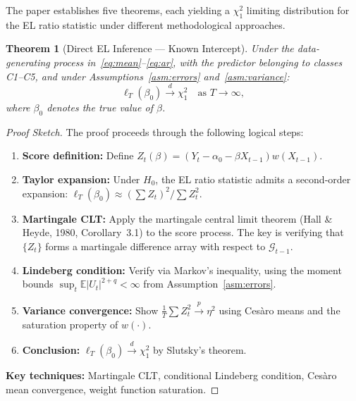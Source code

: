 \documentclass[11pt,a4paper]{article}
\newtheorem{theorem}{Theorem}[section]
\theoremstyle{definition}
\theoremstyle{remark}
\begin{document}
The paper establishes five theorems, each yielding a $\chi^2_1$ limiting distribution
for the EL ratio statistic under different methodological approaches.

\bigskip

\begin{theorem}[Direct EL Inference --- Known Intercept]\label{thm:1}
Under the data-generating process in~\eqref{eq:mean}--\eqref{eq:ar},
with the predictor belonging to classes C1--C5,
and under Assumptions~\ref{asm:errors} and~\ref{asm:variance}:
\begin{equation}
    \ell_T(\beta_0) \xrightarrow{d} \chi^2_1 \quad \text{as } T \to \infty,
\end{equation}
where $\beta_0$ denotes the true value of $\beta$.
\end{theorem}

\begin{proof}[Proof Sketch]
The proof proceeds through the following logical steps:
\begin{enumerate}[leftmargin=*, label=\textbf{\arabic*}.]
    \item \textbf{Score definition:}
    Define $Z_t(\beta) = (Y_t - \alpha_0 - \beta X_{t-1}) w(X_{t-1})$.
    \item \textbf{Taylor expansion:}
    Under $H_0$, the EL ratio statistic admits a second-order expansion:
    $\ell_T(\beta_0) \approx (\sum Z_t)^2 / \sum Z_t^2$.
    \item \textbf{Martingale CLT:}
    Apply the martingale central limit theorem (Hall \& Heyde, 1980, Corollary~3.1)
    to the score process. The key is verifying that $\{Z_t\}$ forms a
    martingale difference array with respect to $\mathcal{G}_{t-1}$.
    \item \textbf{Lindeberg condition:}
    Verify via Markov's inequality, using the moment bounds
    $\sup_t \mathbb{E}|U_t|^{2+q} < \infty$ from Assumption~\ref{asm:errors}.
    \item \textbf{Variance convergence:}
    Show $\frac{1}{T}\sum Z_t^2 \xrightarrow{p} \eta^2$ using
    Ces\`aro means and the saturation property of $w(\cdot)$.
    \item \textbf{Conclusion:}
    $\ell_T(\beta_0) \xrightarrow{d} \chi^2_1$ by Slutsky's theorem.
\end{enumerate}
\textbf{Key techniques:} Martingale CLT, conditional Lindeberg condition,
Ces\`aro mean convergence, weight function saturation.
\end{proof}
\end{document}
